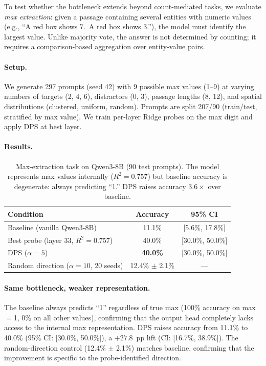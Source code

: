 \documentclass{article}
\begin{document}
To test whether the bottleneck extends beyond count-mediated tasks, we evaluate
\emph{max extraction}: given a passage containing several entities with numeric values
(e.g., ``A red box shows 7.\ A red box shows 3.''), the model must identify the
largest value.
Unlike majority vote, the answer is not determined by counting; it requires a
comparison-based aggregation over entity-value pairs.

\paragraph{Setup.}
We generate 297 prompts (seed 42) with 9 possible max values (1--9) at varying
numbers of targets (2, 4, 6), distractors (0, 3), passage lengths (8, 12),
and spatial distributions (clustered, uniform, random).
Prompts are split 207/90 (train/test, stratified by max value).
We train per-layer Ridge probes on the max digit and apply DPS at best layer.

\paragraph{Results.}

\begin{table}[h]
\centering
\caption{Max-extraction task on Qwen3-8B (90 test prompts).
The model represents max values internally ($R^2 = 0.757$) but baseline
accuracy is degenerate: always predicting ``1.''
DPS raises accuracy $3.6\times$ over baseline.}
\label{tab:max_extraction}
\begin{tabular}{lcc}
\toprule
Condition & Accuracy & 95\% CI \\
\midrule
Baseline (vanilla Qwen3-8B) & 11.1\% & [5.6\%, 17.8\%] \\
Best probe (layer 33, $R^2{=}0.757$) & 40.0\% & [30.0\%, 50.0\%] \\
DPS ($\alpha=5$) & \textbf{40.0\%} & [30.0\%, 50.0\%] \\
Random direction ($\alpha{=}10$, 20 seeds) & 12.4\% $\pm$ 2.1\% & --- \\
\bottomrule
\end{tabular}
\end{table}

\paragraph{Same bottleneck, weaker representation.}
The baseline always predicts ``1'' regardless of true max (100\% accuracy on max$=$1,
0\% on all other values), confirming that the output head completely lacks access to
the internal max representation.
DPS raises accuracy from 11.1\% to 40.0\% (95\% CI: [30.0\%, 50.0\%]),
a $+27.8$~pp lift (CI: [16.7\%, 38.9\%]).
The random-direction control (12.4\% $\pm$ 2.1\%) matches baseline, confirming that the
improvement is specific to the probe-identified direction.
\end{document}
